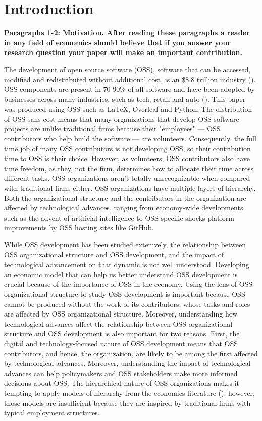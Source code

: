 \documentclass[12pt,notitlepage]{article}
\begin{document}
\section{Introduction}
\textbf{Paragraphs 1-2: Motivation. After reading these paragraphs a reader in any field of economics should believe that if you answer your research question your paper will make an important contribution.}

The development of open source software (OSS), software that can be accessed, modified and redistributed without additional cost, is an \$8.8 trillion industry (\cite{hoffmann_value_2024}). OSS components are present in 70-90\% of all software and have been adopted by businesses across many industries, such as tech, retail and auto (\cite{nagle_open_2017}). This paper was produced using OSS such as LaTeX, Overleaf and Python. The distribution of OSS sans cost means that many organizations that develop OSS software projects are unlike traditional firms because their "employees" --- OSS contributors who help build the software --- are volunteers. Consequently, 
the full time job of many OSS contributors is not developing OSS, so their contribution time to OSS is their choice. However, as volunteers, OSS contributors also have time freedom, as they, not the firm, determines how to allocate their time across different tasks. OSS organizations aren't totally unrecognizable when compared with traditional firms either. OSS organizations have multiple layers of hierarchy. Both the organizational structure and the contributors in the organization are affected by technological advances, ranging from economy-wide developments such as the advent of artificial intelligence to OSS-specific shocks platform improvements by OSS hosting sites like GitHub.

\qquad While OSS development has been studied extenively, the relationship between OSS organizational structure and OSS development, and the impact of technological advancement on that dynamic is not well understood. Developing an economic model that can help us better understand OSS development is crucial because of the importance of OSS in the economy. Using the lens of OSS organizational structure to study OSS development is important because OSS cannot be produced without the work of its contributors, whose tasks and roles are affected by OSS organizational structure. Moreover, understanding how technological advances affect the relationship between OSS organizational structure and OSS development is also important for two reasons. First, the digital and technology-focused nature of OSS development means that OSS contributors, and hence, the organization, are likely to be among the first affected by technological advances. Moreover, understanding the impact of technological advances can help policymakers and OSS stakeholders make more informed decisions about OSS. The hierarchical nature of OSS organizations makes it tempting to apply models of hierarchy from the economics literature (\cite{garicano_hierarchies_2000}); however, those models are insufficient because they are inspired by traditional firms with typical employment structures. 
\end{document}
